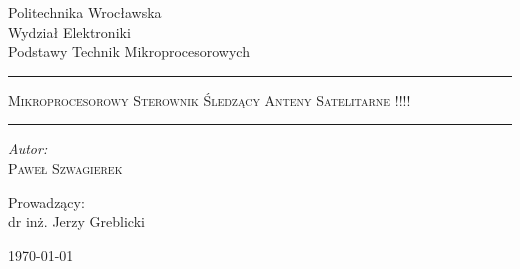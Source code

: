 	\begin{titlepage}

		\vspace*{1cm}

	    \begin{center}
		    \small
		    Politechnika Wrocławska\\
		    Wydział Elektroniki\\
		    Podstawy Technik Mikroprocesorowych
	    \end{center}

	    \vspace{3cm}

		\noindent\rule{\linewidth}{0.4mm}
	    \begin{center}
			\LARGE \textsc{Mikroprocesorowy Sterownik Śledzący Anteny Satelitarne} !!!!
	    \end{center}
		\noindent\rule{\linewidth}{0.4mm}

		\vspace{0.5cm}

	    \begin{flushright}
			\begin{minipage}{6cm}
				\textit{\small Autor:}\\
				\normalsize \textsc{Paweł Szwagierek}
			\end{minipage}
			\vspace{3cm}
			{\small Prowadzący:}\\
			dr inż. Jerzy Greblicki
	    \end{flushright}


	    \begin{center}
		    \today
	    \end{center}	
    \end{titlepage}
